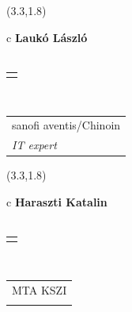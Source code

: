 \documentclass[11pt]{article}
\begin{document}
\makebox(3.3,1.8){
  \renewcommand\arraystretch{1.3}
  \begin{tabular}[c]{c}
    \hspace{8.5mm}
    \LARGE\bf{ Laukó László }\\
    \hspace{8.5mm}
    \Large{  }\\
    \renewcommand\arraystretch{3}
    \begin{tabular}[c]{c}
      \centering
      \fontfamily{phv}\selectfont{
        \textbf{
          \textsc{
            \scriptsize{
            \color{Bright}{ Ismerkedő }\color{Dark}{ Webmester }\color{Bright}{ Sminkmester }\color{Bright}{ Programozó }
            }
          }
        }
      }
    \end{tabular}
    \\
    \renewcommand\arraystretch{1}
    \begin{tabular}{p{3.3in}}
      \hspace{.7cm}sanofi aventis/Chinoin\\
      \hspace{.7cm}\emph{ IT expert }\\
    \end{tabular}
  \end{tabular}
}

\makebox(3.3,1.8){
  \renewcommand\arraystretch{1.3}
  \begin{tabular}[c]{c}
    \hspace{8.5mm}
    \LARGE\bf{ Haraszti Katalin }\\
    \hspace{8.5mm}
    \Large{  }\\
    \renewcommand\arraystretch{3}
    \begin{tabular}[c]{c}
      \centering
      \fontfamily{phv}\selectfont{
        \textbf{
          \textsc{
            \scriptsize{
            \color{Dark}{ Ismerkedő }\color{Bright}{ Webmester }\color{Bright}{ Sminkmester }\color{Bright}{ Programozó }
            }
          }
        }
      }
    \end{tabular}
    \\
    \renewcommand\arraystretch{1}
    \begin{tabular}{p{3.3in}}
      \hspace{.7cm}MTA KSZI\\
      \hspace{.7cm}\emph{  }\\
    \end{tabular}
  \end{tabular}
}
\end{document}
